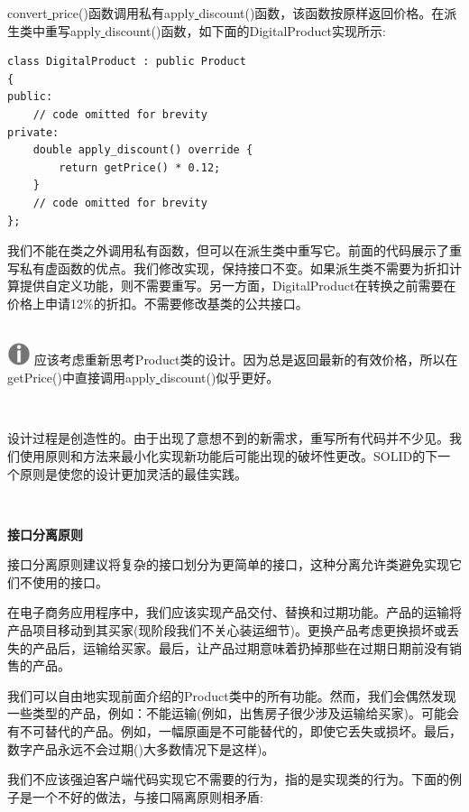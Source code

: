 convert\underline{ }price()函数调用私有apply\underline{ }discount()函数，该函数按原样返回价格。在派生类中重写apply\underline{ }discount()函数，如下面的DigitalProduct实现所示: \par

\begin{lstlisting}[caption={}]
class DigitalProduct : public Product
{
public:
	// code omitted for brevity
private:
	double apply_discount() override {
		return getPrice() * 0.12;
	}
	// code omitted for brevity
};
\end{lstlisting}

我们不能在类之外调用私有函数，但可以在派生类中重写它。前面的代码展示了重写私有虚函数的优点。我们修改实现，保持接口不变。如果派生类不需要为折扣计算提供自定义功能，则不需要重写。另一方面，DigitalProduct在转换之前需要在价格上申请12\%的折扣。不需要修改基类的公共接口。 \par

\hspace*{\fill} \\ %
\includegraphics[width=0.05\textwidth]{images/warn}
应该考虑重新思考Product类的设计。因为总是返回最新的有效价格，所以在getPrice()中直接调用apply\underline{ }discount()似乎更好。 \par
\noindent\textbf{}\ \par

设计过程是创造性的。由于出现了意想不到的新需求，重写所有代码并不少见。我们使用原则和方法来最小化实现新功能后可能出现的破坏性更改。SOLID的下一个原则是使您的设计更加灵活的最佳实践。 \par

\noindent\textbf{}\ \par
\textbf{接口分离原则} \ \par
接口分离原则建议将复杂的接口划分为更简单的接口，这种分离允许类避免实现它们不使用的接口。 \par
在电子商务应用程序中，我们应该实现产品交付、替换和过期功能。产品的运输将产品项目移动到其买家(现阶段我们不关心装运细节)。更换产品考虑更换损坏或丢失的产品后，运输给买家。最后，让产品过期意味着扔掉那些在过期日期前没有销售的产品。 \par
我们可以自由地实现前面介绍的Product类中的所有功能。然而，我们会偶然发现一些类型的产品，例如：不能运输(例如，出售房子很少涉及运输给买家)。可能会有不可替代的产品。例如，一幅原画是不可能替代的，即使它丢失或损坏。最后，数字产品永远不会过期()大多数情况下是这样)。 \par
我们不应该强迫客户端代码实现它不需要的行为，指的是实现类的行为。下面的例子是一个不好的做法，与接口隔离原则相矛盾: \par

